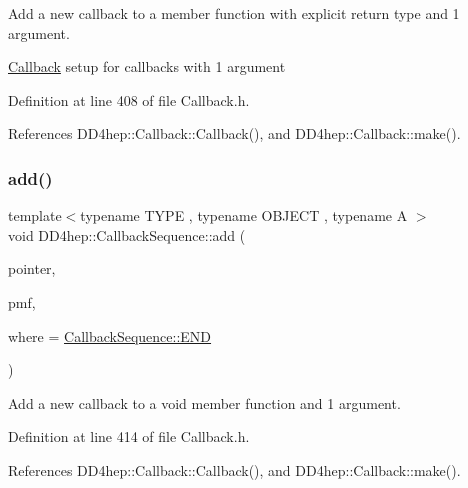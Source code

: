 Add a new callback to a member function with explicit return type and 1 argument. 

\hyperlink{class_d_d4hep_1_1_callback}{Callback} setup for callbacks with 1 argument 

Definition at line 408 of file Callback.\+h.



References D\+D4hep\+::\+Callback\+::\+Callback(), and D\+D4hep\+::\+Callback\+::make().

\hypertarget{struct_d_d4hep_1_1_callback_sequence_ad1614bf4af2c4ec1cf7c30f17e9a4ca2}{}\label{struct_d_d4hep_1_1_callback_sequence_ad1614bf4af2c4ec1cf7c30f17e9a4ca2} 
\subsubsection{\texorpdfstring{add()}{add()}\hspace{0.1cm}{\footnotesize\ttfamily [7/13]}}
{\footnotesize\ttfamily template$<$typename T\+Y\+PE , typename O\+B\+J\+E\+CT , typename A $>$ \\
void D\+D4hep\+::\+Callback\+Sequence\+::add (\begin{DoxyParamCaption}\item[{T\+Y\+PE $\ast$}]{pointer,  }\item[{void(O\+B\+J\+E\+C\+T\+::$\ast$)(A)}]{pmf,  }\item[{\hyperlink{struct_d_d4hep_1_1_callback_sequence_a7753490247479633aed16a2376821ef7}{Location}}]{where = {\ttfamily \hyperlink{struct_d_d4hep_1_1_callback_sequence_a7753490247479633aed16a2376821ef7ac39eeb1bcfc1c235ab1d0d9315c310ac}{Callback\+Sequence\+::\+E\+ND}} }\end{DoxyParamCaption})\hspace{0.3cm}{\ttfamily [inline]}}



Add a new callback to a void member function and 1 argument. 



Definition at line 414 of file Callback.\+h.



References D\+D4hep\+::\+Callback\+::\+Callback(), and D\+D4hep\+::\+Callback\+::make().

\hypertarget{struct_d_d4hep_1_1_callback_sequence_ac1c60885d1a8ca30427c1e8401c04f23}{}\label{struct_d_d4hep_1_1_callback_sequence_ac1c60885d1a8ca30427c1e8401c04f23} 
